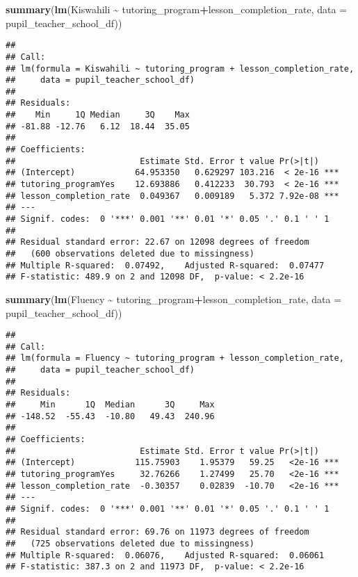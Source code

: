 \documentclass[
]{article}
\newenvironment{Shaded}{\begin{snugshade}}{\end{snugshade}}
\newcommand{\AttributeTok}[1]{\textcolor[rgb]{0.13,0.29,0.53}{#1}}
\newcommand{\FunctionTok}[1]{\textcolor[rgb]{0.13,0.29,0.53}{\textbf{#1}}}
\newcommand{\NormalTok}[1]{#1}
\newcommand{\SpecialCharTok}[1]{\textcolor[rgb]{0.81,0.36,0.00}{\textbf{#1}}}
\begin{document}
\begin{Shaded}
\begin{Highlighting}[]
\FunctionTok{summary}\NormalTok{(}\FunctionTok{lm}\NormalTok{(Kiswahili }\SpecialCharTok{\textasciitilde{}}\NormalTok{ tutoring\_program}\SpecialCharTok{+}\NormalTok{lesson\_completion\_rate, }\AttributeTok{data =}\NormalTok{ pupil\_teacher\_school\_df))}
\end{Highlighting}
\end{Shaded}

\begin{verbatim}
## 
## Call:
## lm(formula = Kiswahili ~ tutoring_program + lesson_completion_rate, 
##     data = pupil_teacher_school_df)
## 
## Residuals:
##    Min     1Q Median     3Q    Max 
## -81.88 -12.76   6.12  18.44  35.05 
## 
## Coefficients:
##                         Estimate Std. Error t value Pr(>|t|)    
## (Intercept)            64.953350   0.629297 103.216  < 2e-16 ***
## tutoring_programYes    12.693886   0.412233  30.793  < 2e-16 ***
## lesson_completion_rate  0.049367   0.009189   5.372 7.92e-08 ***
## ---
## Signif. codes:  0 '***' 0.001 '**' 0.01 '*' 0.05 '.' 0.1 ' ' 1
## 
## Residual standard error: 22.67 on 12098 degrees of freedom
##   (600 observations deleted due to missingness)
## Multiple R-squared:  0.07492,    Adjusted R-squared:  0.07477 
## F-statistic: 489.9 on 2 and 12098 DF,  p-value: < 2.2e-16
\end{verbatim}

\begin{Shaded}
\begin{Highlighting}[]
\FunctionTok{summary}\NormalTok{(}\FunctionTok{lm}\NormalTok{(Fluency }\SpecialCharTok{\textasciitilde{}}\NormalTok{ tutoring\_program}\SpecialCharTok{+}\NormalTok{lesson\_completion\_rate, }\AttributeTok{data =}\NormalTok{ pupil\_teacher\_school\_df))}
\end{Highlighting}
\end{Shaded}

\begin{verbatim}
## 
## Call:
## lm(formula = Fluency ~ tutoring_program + lesson_completion_rate, 
##     data = pupil_teacher_school_df)
## 
## Residuals:
##     Min      1Q  Median      3Q     Max 
## -148.52  -55.43  -10.80   49.43  240.96 
## 
## Coefficients:
##                         Estimate Std. Error t value Pr(>|t|)    
## (Intercept)            115.75903    1.95379   59.25   <2e-16 ***
## tutoring_programYes     32.76266    1.27499   25.70   <2e-16 ***
## lesson_completion_rate  -0.30357    0.02839  -10.70   <2e-16 ***
## ---
## Signif. codes:  0 '***' 0.001 '**' 0.01 '*' 0.05 '.' 0.1 ' ' 1
## 
## Residual standard error: 69.76 on 11973 degrees of freedom
##   (725 observations deleted due to missingness)
## Multiple R-squared:  0.06076,    Adjusted R-squared:  0.06061 
## F-statistic: 387.3 on 2 and 11973 DF,  p-value: < 2.2e-16
\end{verbatim}
\end{document}

